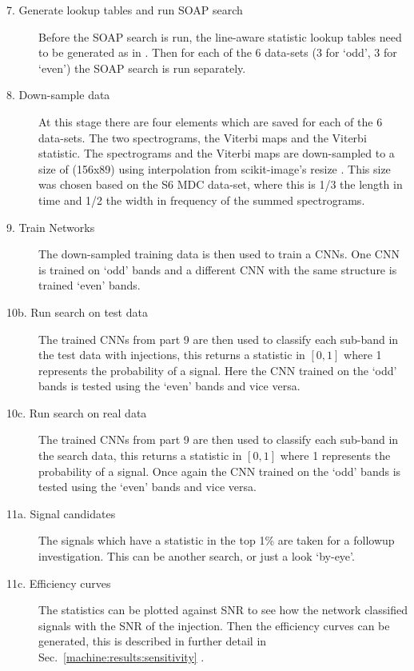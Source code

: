 \begin{description}
	\item[7. Generate lookup tables and run SOAP search] Before the SOAP search is run, the line-aware statistic lookup tables need to be generated as in \cite{bayley2019SOAPGeneralised}. Then for each of the 6 data-sets (3 for `odd', 3 for `even') the SOAP search is run separately. 
	
	\item[8. Down-sample data] At this stage there are four elements which are saved for each of the 6 data-sets. The two spectrograms, the Viterbi maps and the Viterbi statistic. The spectrograms and the Viterbi maps are down-sampled to a size of (156x89) using interpolation from scikit-image's resize \cite{vanderwalt2014ScikitimageImage}. This size was chosen based on the S6 \ac{MDC} data-set, where this is 1/3 the length in time and 1/2 the width in frequency of the summed spectrograms.
	
	\item[9. Train Networks] The down-sampled training data is then used to train a \acp{CNN}. One \ac{CNN} is trained on `odd' bands and a different \ac{CNN} with the same structure is trained `even' bands. 
	
	\item[10b. Run search on test data] The trained \acp{CNN} from part 9 are then used to classify each sub-band in the test data with injections, this returns a statistic in $[0,1]$ where 1 represents the probability of a signal. Here the \ac{CNN} trained on the `odd' bands is tested using the `even' bands and vice versa.
	
	\item[10c. Run search on real data] The trained \acp{CNN} from part 9 are then used to classify each sub-band in the search data, this returns a statistic in $[0,1]$ where 1 represents the probability of a signal. Once again the \ac{CNN} trained on the `odd' bands is tested using the `even' bands and vice versa.
	
	\item[11a. Signal candidates] The signals which have a statistic in the top 1\% are taken for a followup investigation. This can be another search, or just a look `by-eye'.
	
	\item[11c. Efficiency curves] The statistics can be plotted against \ac{SNR} to see how the network classified signals with the \ac{SNR} of the injection. Then the efficiency curves can be generated, this is described in further detail in Sec.~\ref{machine:results:sensitivity} .
	
	
	
\end{description}


